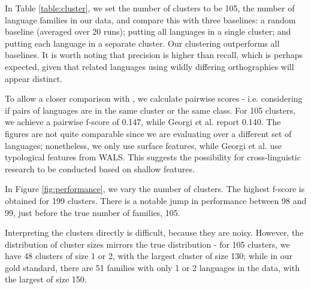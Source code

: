 In Table \ref{table:cluster}, we set the number of clusters to be 105, the number of language families in our data, and compare this with three baselines: a random baseline (averaged over 20 runs); putting all languages in a single cluster; and putting each language in a separate cluster. Our clustering outperforms all baselines. It is worth noting that precision is higher than recall, which is perhaps expected, given that related languages using wildly differing orthographies will appear distinct.

To allow a closer comparison with , we calculate pairwise scores - i.e. considering if pairs of languages are in the same cluster or the same class. For 105 clusters, we achieve a pairwise f-score of 0.147, while Georgi et al. report 0.140. The figures are not quite comparable since we are evaluating over a different set of languages; nonetheless, we only use surface features, while Georgi et al. use typological features from WALS.  This suggests the possibility for cross-linguistic research to be conducted based on shallow features.

In Figure \ref{fig:performance}, we vary the number of clusters. The highest f-score is obtained for 199 clusters. There is a notable jump in performance between 98 and 99, just before the true number of families, 105.

Interpreting the clusters directly is difficult, because they are noisy.  However, the distribution of cluster sizes mirrors the true distribution - for 105 clusters, we have 48 clusters of size 1 or 2, with the largest cluster of size 130; while in our gold standard, there are 51 families with only 1 or 2 languages in the data, with the largest of size 150.
